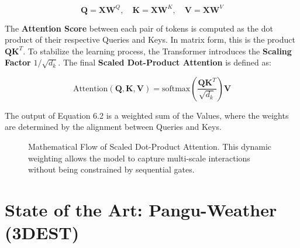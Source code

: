 \begin{equation}
\mathbf{Q} = \mathbf{X} \mathbf{W}^Q, \quad \mathbf{K} = \mathbf{X} \mathbf{W}^K, \quad \mathbf{V} = \mathbf{X} \mathbf{W}^V
\end{equation}

The \textbf{Attention Score} between each pair of tokens is computed as the dot product of their respective Queries and Keys. In matrix form, this is the product $\mathbf{Q}\mathbf{K}^T$. To stabilize the learning process, the Transformer introduces the \textbf{Scaling Factor} $1/\sqrt{d_k}$. The final \textbf{Scaled Dot-Product Attention} is defined as:

\begin{equation}
\text{Attention}(\mathbf{Q}, \mathbf{K}, \mathbf{V}) = \text{softmax}\left(\frac{\mathbf{Q}\mathbf{K}^T}{\sqrt{d_k}}\right)\mathbf{V}
\end{equation}

The output of Equation 6.2 is a weighted sum of the Values, where the weights are determined by the alignment between Queries and Keys.

\begin{figure}[H]
\centering
{}
\caption{Mathematical Flow of Scaled Dot-Product Attention. This dynamic weighting allows the model to capture multi-scale interactions without being constrained by sequential gates.}
\label{fig:attention_tikz}
\end{figure}

\section{State of the Art: Pangu-Weather (3DEST)}

